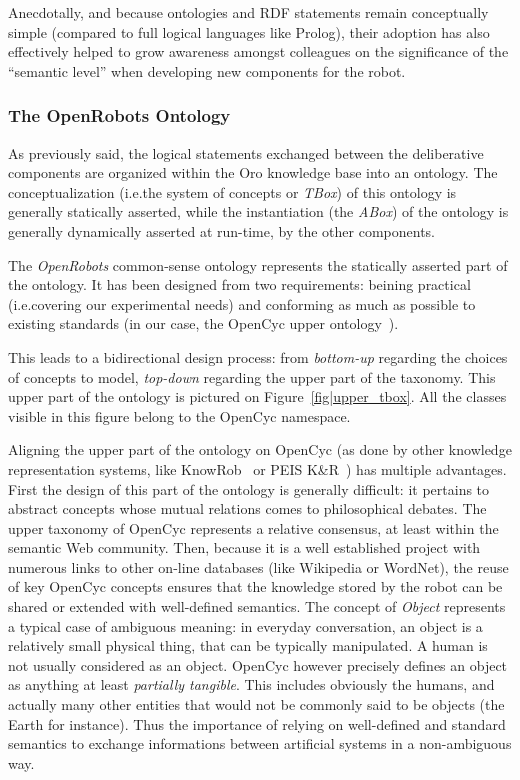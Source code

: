 \documentclass[preprint,3p,times]{elsarticle}
\newcommand{\ie}{{i.e.\xspace}}
\begin{document}
Anecdotally, and because ontologies and RDF statements remain conceptually simple
(compared to full logical languages like {\sc Prolog}), their adoption has also
effectively helped to grow awareness amongst colleagues on the significance of
the ``semantic level'' when developing new components for the robot.

\subsubsection{The OpenRobots Ontology}

As previously said, the logical statements exchanged between the deliberative
components are organized within the {\sc Oro} knowledge base into an ontology.
The conceptualization (\ie the system of concepts or \emph{TBox}) of this
ontology is generally statically asserted, while the instantiation (the
\emph{ABox}) of the ontology is generally dynamically asserted at run-time, by
the other components.

The \emph{OpenRobots} common-sense ontology represents the statically asserted
part of the ontology. It has been designed from two requirements: beining
practical (\ie covering our experimental needs) and conforming as much as
possible to existing standards (in our case, the {\sc OpenCyc} upper
ontology~\cite{lenat1990cyc}).

This leads to a bidirectional design process: from \emph{bottom-up} regarding
the choices of concepts to model, \emph{top-down} regarding the upper part of
the taxonomy. This upper part of the ontology is pictured on
Figure~\ref{fig|upper_tbox}. All the classes visible in this figure belong to
the {\sc OpenCyc} namespace.

Aligning the upper part of the ontology on {\sc OpenCyc} (as done by other
knowledge representation systems, like {\sc KnowRob}~\cite{Tenorth2009a} or PEIS
K\&R~\cite{Daoutis2009}) has multiple advantages. First the design of this part
of the ontology is generally difficult: it pertains to abstract concepts whose
mutual relations comes to philosophical debates. The upper taxonomy of {\sc
OpenCyc} represents a relative consensus, at least within the semantic Web
community. Then, because it is a well established project with numerous links to
other on-line databases (like Wikipedia or WordNet), the reuse of key {\sc
OpenCyc} concepts ensures that the knowledge stored by the robot can be shared
or extended with well-defined semantics. The concept of \emph{Object} represents
a typical case of ambiguous meaning: in everyday conversation, an object is a
relatively small physical thing, that can be typically manipulated. A human is
not usually considered as an object. {\sc OpenCyc} however precisely defines an
object as anything at least \emph{partially tangible}. This includes obviously
the humans, and actually many other entities that would not be commonly said to
be objects (the Earth for instance). Thus the importance of relying on
well-defined and standard semantics to exchange informations between artificial
systems in a non-ambiguous way.
\end{document}
